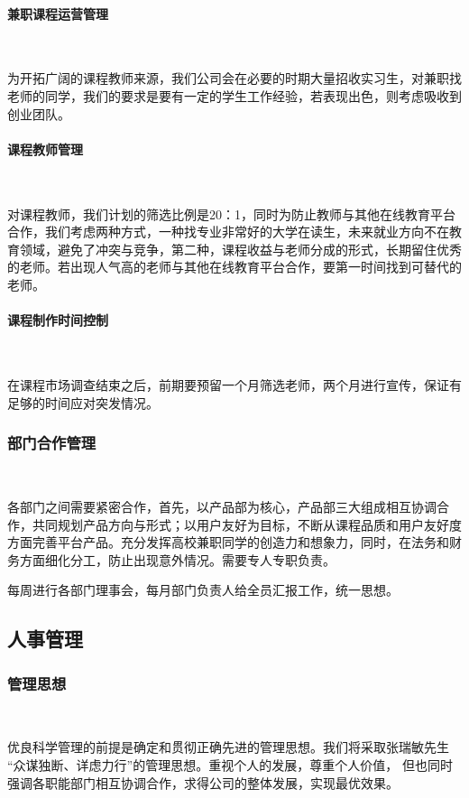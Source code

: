 \paragraph{兼职课程运营管理}\

为开拓广阔的课程教师来源，我们公司会在必要的时期大量招收实习生，对兼职找老师的同学，我们的要求是要有一定的学生工作经验，若表现出色，则考虑吸收到创业团队。

\paragraph{课程教师管理}\

对课程教师，我们计划的筛选比例是20：1，同时为防止教师与其他在线教育平台合作，我们考虑两种方式，一种找专业非常好的大学在读生，未来就业方向不在教育领域，避免了冲突与竞争，第二种，课程收益与老师分成的形式，长期留住优秀的老师。若出现人气高的老师与其他在线教育平台合作，要第一时间找到可替代的老师。

\paragraph{课程制作时间控制}\

在课程市场调查结束之后，前期要预留一个月筛选老师，两个月进行宣传，保证有足够的时间应对突发情况。

\subsubsection{部门合作管理}\

各部门之间需要紧密合作，首先，以产品部为核心，产品部三大组成相互协调合作，共同规划产品方向与形式；以用户友好为目标，不断从课程品质和用户友好度方面完善平台产品。充分发挥高校兼职同学的创造力和想象力，同时，在法务和财务方面细化分工，防止出现意外情况。需要专人专职负责。

每周进行各部门理事会，每月部门负责人给全员汇报工作，统一思想。

\subsection{人事管理}
\subsubsection{管理思想}\

优良科学管理的前提是确定和贯彻正确先进的管理思想。我们将采取张瑞敏先生 “众谋独断、详虑力行”的管理思想。重视个人的发展，尊重个人价值， 但也同时强调各职能部门相互协调合作，求得公司的整体发展，实现最优效果。

